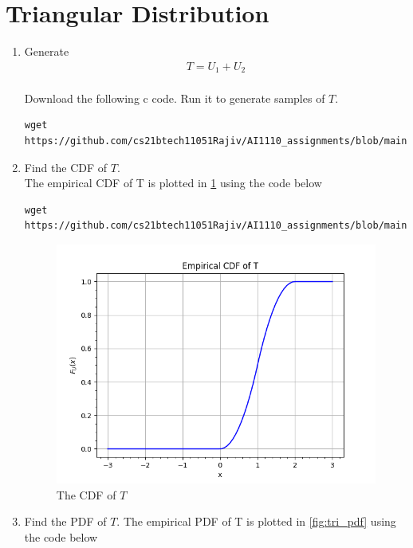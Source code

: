 \documentclass[journal,12pt,twocolumn]{IEEEtran}
\renewcommand\thesection{\arabic{section}}
\begin{document}
\section{Triangular Distribution}
\begin{enumerate}[label=\thesection.\arabic*
,ref=\thesection.\theenumi]
%
\item Generate 
	\begin{align}
		T = U_1+U_2
	\end{align}
\\
\solution Download the following c code. Run it to generate samples of $T$.
\begin{lstlisting}
wget https://github.com/cs21btech11051Rajiv/AI1110_assignments/blob/main/manual1/code/q4/4p1.c
\end{lstlisting}
%
\item Find the CDF of $T$.
\\
\solution The empirical CDF of T is plotted in \ref{fig:tri_cdf} using the code below
\begin{lstlisting}
wget https://github.com/cs21btech11051Rajiv/AI1110_assignments/blob/main/manual1/code/q4/4p2.py
\end{lstlisting}
\begin{figure}[ht!]
	\centering
	\includegraphics[width=\columnwidth]{./figs/fig4.2.png}
	\caption{The CDF of $T$}
	\label{fig:tri_cdf}
\end{figure}
\item Find the PDF of $T$.
\solution The empirical PDF of T is plotted in \ref{fig:tri_pdf} using the code below
\begin{lstlisting}

\end{lstlisting}
\end{enumerate}
\end{document}
